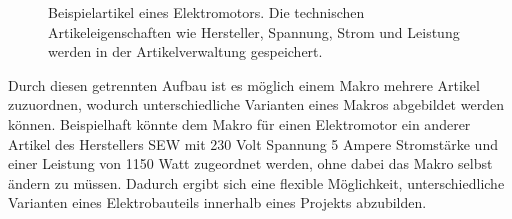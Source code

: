 \begin{figure}[H] 
    \centering 
    \caption{ Beispielartikel eines Elektromotors. Die technischen Artikeleigenschaften wie Hersteller, Spannung, Strom und Leistung werden in der Artikelverwaltung gespeichert. } 
    \label{fig:beispielartikel_elektromotor} 
\end{figure}


Durch diesen getrennten Aufbau ist es möglich einem Makro mehrere Artikel zuzuordnen, wodurch unterschiedliche Varianten eines Makros abgebildet werden können.
Beispielhaft könnte dem Makro für einen Elektromotor ein anderer Artikel des Herstellers SEW mit 230 Volt Spannung 5 Ampere Stromstärke und einer Leistung von 1150 Watt zugeordnet werden, ohne dabei das Makro selbst ändern zu müssen.
Dadurch ergibt sich eine flexible Möglichkeit, unterschiedliche Varianten eines Elektrobauteils innerhalb eines Projekts abzubilden. 

